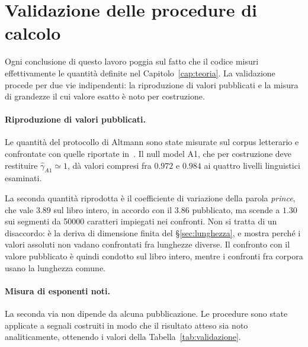 \section{Validazione delle procedure di calcolo}
\label{sec:validazione}

Ogni conclusione di questo lavoro poggia sul fatto che il codice misuri
effettivamente le quantità definite nel Capitolo~\ref{cap:teoria}. La
validazione procede per due vie indipendenti: la riproduzione di valori
pubblicati e la misura di grandezze il cui valore esatto è noto per costruzione.

\paragraph{Riproduzione di valori pubblicati.}
Le quantità del protocollo di Altmann sono state misurate sul corpus letterario
e confrontate con quelle riportate in~\cite{altmann2012}. Il null model A1, che
per costruzione deve restituire $\hat\gamma_{A1} \simeq 1$, dà valori compresi
fra $0.972$ e $0.984$ ai quattro livelli linguistici esaminati.

La seconda quantità riprodotta è il coefficiente di variazione della parola
\emph{prince}, che vale $3.89$ sul libro intero, in accordo con il $3.86$
pubblicato, ma scende a $1.30$ sui segmenti da \num{50000} caratteri impiegati
nei confronti. Non si tratta di un disaccordo: è la deriva di dimensione finita del
§\ref{sec:lunghezza}, e mostra perché i valori assoluti non vadano confrontati
fra lunghezze diverse. Il confronto con il valore pubblicato è quindi condotto
sul libro intero, mentre i confronti fra corpora usano la lunghezza comune.

\paragraph{Misura di esponenti noti.}
La seconda via non dipende da alcuna pubblicazione. Le procedure sono state
applicate a segnali costruiti in modo che il risultato atteso sia noto
analiticamente, ottenendo i valori della Tabella~\ref{tab:validazione}.

